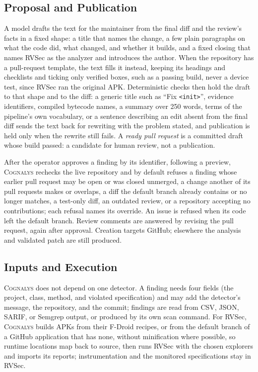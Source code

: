 \documentclass[conference]{IEEEtran}
\newcommand{\system}{\textsc{Cognalys}}
\begin{document}
\subsection{Proposal and Publication}

A model drafts the text for the maintainer from the final diff and the review's facts in a fixed shape: a title
that names the change, a few plain paragraphs on what the code did, what
changed, and whether it builds, and a fixed closing that names RVSec as the
analyzer and introduces the author. When the repository has a pull-request
template, the text fills it instead, keeping its headings and checklists and
ticking only verified boxes, such as a passing build, never a device test,
since RVSec ran the original APK. Deterministic checks then hold the draft to
that shape and to the diff: a generic title such as ``Fix \texttt{<init>}'',
evidence identifiers, compiled bytecode names, a summary over 250 words, terms
of the pipeline's own vocabulary, or a sentence describing an
edit absent from the final diff sends the text back for rewriting with the
problem stated, and publication is held only when the rewrite still fails.
A \emph{ready pull request} is a committed
draft whose build passed: a candidate for human review, not a publication.

After the operator approves a finding by its identifier, following a preview,
\system{} rechecks the live repository and by default refuses a finding whose
earlier pull request may be open or was closed unmerged, a change another of
its pull requests makes or overlaps, a diff the default branch already contains
or no longer matches, a test-only diff, an outdated review, or a repository
accepting no contributions; each refusal names its override. An issue is
refused when its code left the default branch. Review comments are answered by
revising the pull request, again after approval. Creation targets GitHub;
elsewhere the analysis and validated patch are still produced.

\subsection{Inputs and Execution}

\system{} does not depend on one detector. A finding needs four fields (the
project, class, method, and violated specification) and may add the detector's
message, the repository, and the commit; findings are read from CSV, JSON,
SARIF, or Semgrep output, or produced by its own scan command. For RVSec, \system{}
builds APKs from their F-Droid recipes, or from the default branch of a GitHub
application that has none, without minification where possible, so runtime
locations map back to source, then runs RVSec with the chosen explorers and
imports its reports; instrumentation and the monitored specifications stay in
RVSec.
\end{document}
